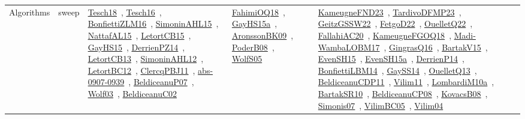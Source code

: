 {\begin{longtable}{lp{3cm}>{\raggedright\arraybackslash}p{6cm}>{\raggedright\arraybackslash}p{6cm}>{\raggedright\arraybackslash}p{8cm}}
Algorithms & sweep & \href{works/Tesch18.pdf}{Tesch18}~\cite{Tesch18}, \href{works/Tesch16.pdf}{Tesch16}~\cite{Tesch16}, \href{works/BonfiettiZLM16.pdf}{BonfiettiZLM16}~\cite{BonfiettiZLM16}, \href{works/SimoninAHL15.pdf}{SimoninAHL15}~\cite{SimoninAHL15}, \href{works/NattafAL15.pdf}{NattafAL15}~\cite{NattafAL15}, \href{works/LetortCB15.pdf}{LetortCB15}~\cite{LetortCB15}, \href{works/GayHS15.pdf}{GayHS15}~\cite{GayHS15}, \href{works/DerrienPZ14.pdf}{DerrienPZ14}~\cite{DerrienPZ14}, \href{works/LetortCB13.pdf}{LetortCB13}~\cite{LetortCB13}, \href{works/SimoninAHL12.pdf}{SimoninAHL12}~\cite{SimoninAHL12}, \href{works/LetortBC12.pdf}{LetortBC12}~\cite{LetortBC12}, \href{works/ClercqPBJ11.pdf}{ClercqPBJ11}~\cite{ClercqPBJ11}, \href{works/abs-0907-0939.pdf}{abs-0907-0939}~\cite{abs-0907-0939}, \href{works/BeldiceanuP07.pdf}{BeldiceanuP07}~\cite{BeldiceanuP07}, \href{works/Wolf03.pdf}{Wolf03}~\cite{Wolf03}, \href{works/BeldiceanuC02.pdf}{BeldiceanuC02}~\cite{BeldiceanuC02} & \href{works/FahimiOQ18.pdf}{FahimiOQ18}~\cite{FahimiOQ18}, \href{works/GayHS15a.pdf}{GayHS15a}~\cite{GayHS15a}, \href{works/AronssonBK09.pdf}{AronssonBK09}~\cite{AronssonBK09}, \href{works/PoderB08.pdf}{PoderB08}~\cite{PoderB08}, \href{works/WolfS05.pdf}{WolfS05}~\cite{WolfS05} & \href{works/KameugneFND23.pdf}{KameugneFND23}~\cite{KameugneFND23}, \href{works/TardivoDFMP23.pdf}{TardivoDFMP23}~\cite{TardivoDFMP23}, \href{works/GeitzGSSW22.pdf}{GeitzGSSW22}~\cite{GeitzGSSW22}, \href{works/FetgoD22.pdf}{FetgoD22}~\cite{FetgoD22}, \href{works/OuelletQ22.pdf}{OuelletQ22}~\cite{OuelletQ22}, \href{works/FallahiAC20.pdf}{FallahiAC20}~\cite{FallahiAC20}, \href{works/KameugneFGOQ18.pdf}{KameugneFGOQ18}~\cite{KameugneFGOQ18}, \href{works/Madi-WambaLOBM17.pdf}{Madi-WambaLOBM17}~\cite{Madi-WambaLOBM17}, \href{works/GingrasQ16.pdf}{GingrasQ16}~\cite{GingrasQ16}, \href{works/BartakV15.pdf}{BartakV15}~\cite{BartakV15}, \href{works/EvenSH15.pdf}{EvenSH15}~\cite{EvenSH15}, \href{works/EvenSH15a.pdf}{EvenSH15a}~\cite{EvenSH15a}, \href{works/DerrienP14.pdf}{DerrienP14}~\cite{DerrienP14}, \href{works/BonfiettiLBM14.pdf}{BonfiettiLBM14}~\cite{BonfiettiLBM14}, \href{works/GaySS14.pdf}{GaySS14}~\cite{GaySS14}, \href{works/OuelletQ13.pdf}{OuelletQ13}~\cite{OuelletQ13}, \href{works/BeldiceanuCDP11.pdf}{BeldiceanuCDP11}~\cite{BeldiceanuCDP11}, \href{works/Vilim11.pdf}{Vilim11}~\cite{Vilim11}, \href{works/LombardiM10a.pdf}{LombardiM10a}~\cite{LombardiM10a}, \href{works/BartakSR10.pdf}{BartakSR10}~\cite{BartakSR10}, \href{works/BeldiceanuCP08.pdf}{BeldiceanuCP08}~\cite{BeldiceanuCP08}, \href{works/KovacsB08.pdf}{KovacsB08}~\cite{KovacsB08}, \href{works/Simonis07.pdf}{Simonis07}~\cite{Simonis07}, \href{works/VilimBC05.pdf}{VilimBC05}~\cite{VilimBC05}, \href{works/Vilim04.pdf}{Vilim04}~\cite{Vilim04}\\

\end{longtable}}

